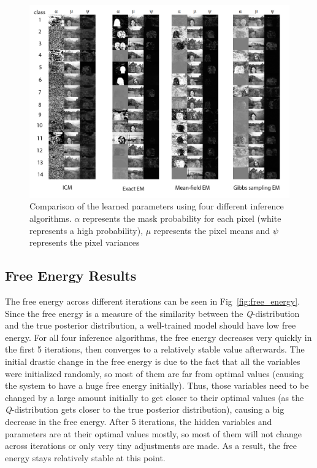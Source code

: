 \documentclass{article} %
\begin{document}
\begin{figure}[h]
\begin{center}
\includegraphics[width=1\textwidth]{final_plot1}
\end{center}
\caption{Comparison of the learned parameters using four different inference algorithms. \textit{$\alpha$} represents the mask probability for each pixel (white represents a high probability), \textit{$\mu$} represents the pixel means and \textit{$\psi$} represents the pixel variances}
\label{fig:model_com}
\end{figure}

\subsection{Free Energy Results}
\label{free_energy_result}
The free energy across different iterations can be seen in Fig~\ref{fig:free_energy}. Since the free energy is a measure of the similarity between the \textit{Q}-distribution and the true posterior distribution, a well-trained model should have low free energy. For all four inference algorithms, the free energy decreases very quickly in the first 5 iterations, then converges to a relatively stable value afterwards. The initial drastic change in the free energy is due to the fact that all the variables were initialized randomly, so most of them are far from optimal values (causing the system to have a huge free energy initially). Thus, those variables need to be changed by a large amount initially to get closer to their optimal values (as the \textit{Q}-distribution gets closer to the true posterior distribution), causing a big decrease in the free energy. After 5 iterations, the hidden variables and parameters are at their optimal values mostly, so most of them will not change across iterations or only very tiny adjustments are made. As a result, the free energy stays relatively stable at this point. 
\end{document}
